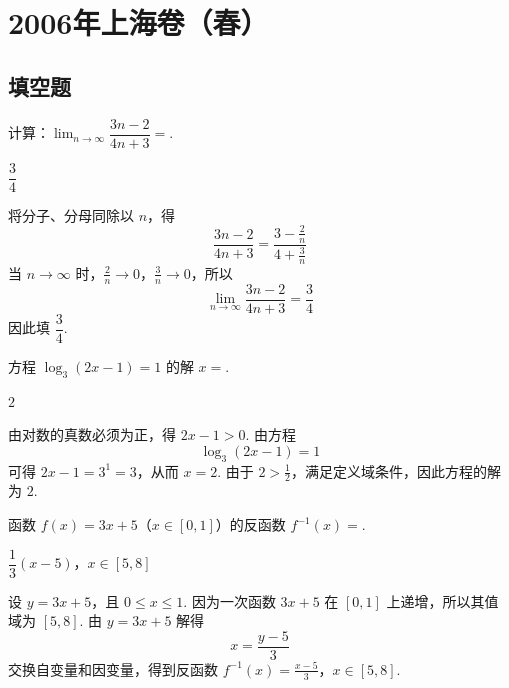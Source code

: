\chapter{2006年上海卷（春）}

\section{填空题}

\begin{problem}
计算：\(\displaystyle\lim_{n\to\infty}\dfrac{3n-2}{4n+3}=\)\fillinblank{}.
\end{problem}

\begin{answer}
\(\dfrac34\)
\end{answer}

\begin{solution}
将分子、分母同除以 \(n\)，得
\[
\frac{3n-2}{4n+3}=\frac{3-\frac2n}{4+\frac3n}
\]
当 \(n\to\infty\) 时，\(\frac2n\to0\)，\(\frac3n\to0\)，所以
\[
\lim_{n\to\infty}\frac{3n-2}{4n+3}=\frac{3}{4}
\]
因此填 \(\dfrac34\).
\end{solution}

\begin{problem}
方程 \(\log_3(2x-1)=1\) 的解 \(x=\)\fillinblank{}.
\end{problem}

\begin{answer}
\(2\)
\end{answer}

\begin{solution}
由对数的真数必须为正，得 \(2x-1>0\). 由方程
\[
\log_3(2x-1)=1
\]
可得 \(2x-1=3^1=3\)，从而 \(x=2\). 由于 \(2>\frac12\)，满足定义域条件，因此方程的解为 \(2\).
\end{solution}

\begin{problem}
函数 \(f(x)=3x+5\)（\(x\in[0,1]\)）的反函数 \(f^{-1}(x)=\)\fillinblank{}.
\end{problem}

\begin{answer}
\(\dfrac13(x-5)\)，\(x\in[5,8]\)
\end{answer}

\begin{solution}
设 \(y=3x+5\)，且 \(0\le x\le1\). 因为一次函数 \(3x+5\) 在 \([0,1]\) 上递增，所以其值域为 \([5,8]\). 由 \(y=3x+5\) 解得
\[
x=\frac{y-5}{3}
\]
交换自变量和因变量，得到反函数
\(f^{-1}(x)=\frac{x-5}{3}\)，\(x\in[5,8]\).
\end{solution}

